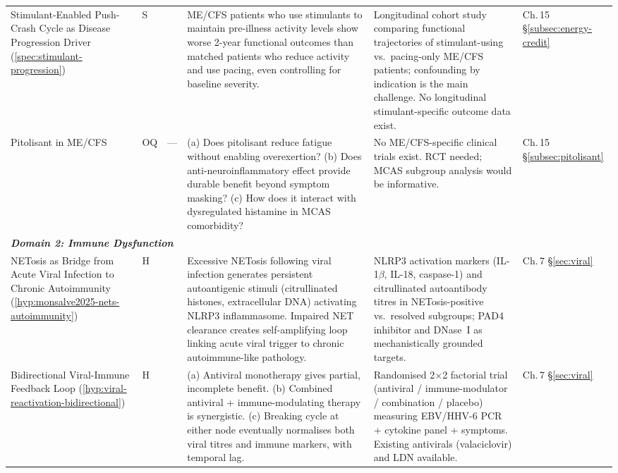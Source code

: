 \begin{longtable}{%
  p{3.0cm}
  >{\centering\arraybackslash}p{0.55cm}
  >{\centering\arraybackslash}p{1.0cm}
  p{3.8cm}
  p{3.8cm}
  p{2.2cm}
}
Stimulant-Enabled Push-Crash Cycle as Disease Progression Driver
(\ref{spec:stimulant-progression})
&
S & 0.40
&
ME/CFS patients who use stimulants to maintain pre-illness activity levels
show worse 2-year functional outcomes than matched patients who reduce
activity and use pacing, even controlling for baseline severity.
&
Longitudinal cohort study comparing functional trajectories of
stimulant-using vs.\ pacing-only ME/CFS patients; confounding by
indication is the main challenge.
No longitudinal stimulant-specific outcome data exist.
&
Ch.\,15 \S\ref{subsec:energy-credit} \\[6pt]

Pitolisant in ME/CFS
&
OQ & ---
&
(a) Does pitolisant reduce fatigue without enabling overexertion?
(b) Does anti-neuroinflammatory effect provide durable benefit beyond symptom masking?
(c) How does it interact with dysregulated histamine in MCAS comorbidity?
&
No ME/CFS-specific clinical trials exist.
RCT needed; MCAS subgroup analysis would be informative.
&
Ch.\,15 \S\ref{subsec:pitolisant} \\[6pt]

\multicolumn{6}{l}{\small\textit{\textbf{Domain 2: Immune Dysfunction}}} \\[2pt]

NETosis as Bridge from Acute Viral Infection to Chronic Autoimmunity
(\ref{hyp:monsalve2025-nets-autoimmunity})
&
H & 0.70
&
Excessive NETosis following viral infection generates persistent autoantigenic
stimuli (citrullinated histones, extracellular DNA) activating NLRP3
inflammasome. Impaired NET clearance creates self-amplifying loop linking
acute viral trigger to chronic autoimmune-like pathology.
&
NLRP3 activation markers (IL-1$\beta$, IL-18, caspase-1) and citrullinated
autoantibody titres in NETosis-positive vs.\ resolved subgroups;
PAD4 inhibitor and DNase~I as mechanistically grounded targets.
&
Ch.\,7 \S\ref{sec:viral} \\[6pt]

Bidirectional Viral-Immune Feedback Loop
(\ref{hyp:viral-reactivation-bidirectional})
&
H & 0.50
&
(a) Antiviral monotherapy gives partial, incomplete benefit.
(b) Combined antiviral + immune-modulating therapy is synergistic.
(c) Breaking cycle at either node eventually normalises both viral titres and
immune markers, with temporal lag.
&
Randomised 2$\times$2 factorial trial (antiviral / immune-modulator /
combination / placebo) measuring EBV/HHV-6 PCR + cytokine panel + symptoms.
Existing antivirals (valaciclovir) and LDN available.
&
Ch.\,7 \S\ref{sec:viral} \\[6pt]


\end{longtable}
